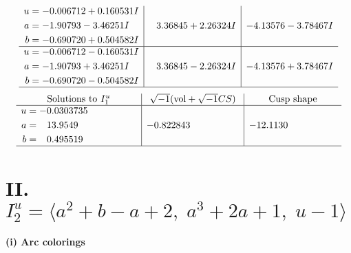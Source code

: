 \documentclass[1p]{elsarticle_modified}
\theoremstyle{definition}
\newcommand{\I}{\sqrt{-1}}
\begin{document}
$$\begin{array}{c|c|c}
\begin{aligned}
u &= -0.006712 + 0.160531 I \\
a &= -1.90793 - 3.46251 I \\
b &= -0.690720 + 0.504582 I\end{aligned}
 & \phantom{-}3.36845 + 2.26324 I & -4.13576 - 3.78467 I \\ \hline\begin{aligned}
u &= -0.006712 - 0.160531 I \\
a &= -1.90793 + 3.46251 I \\
b &= -0.690720 - 0.504582 I\end{aligned}
 & \phantom{-}3.36845 - 2.26324 I & -4.13576 + 3.78467 I\\
 \hline 
 \end{array}$$\newpage$$\begin{array}{c|c|c}  
\text{Solutions to }I^u_{1}& \I (\text{vol} + \sqrt{-1}CS) & \text{Cusp shape}\\
 \hline 
\begin{aligned}
u &= -0.0303735\phantom{ +0.000000I} \\
a &= \phantom{-}13.9549\phantom{ +0.000000I} \\
b &= \phantom{-}0.495519\phantom{ +0.000000I}\end{aligned}
 & -0.822843\phantom{ +0.000000I} & -12.1130\phantom{ +0.000000I}\\
 \hline 
 \end{array}$$\newpage\newpage\renewcommand{\arraystretch}{1}
\centering \section*{II. $I^u_{2}= \langle a^2+b- a+2,\;a^3+2 a+1,\;u-1 \rangle$}
\flushleft \textbf{(i) Arc colorings}\\
\end{document}
